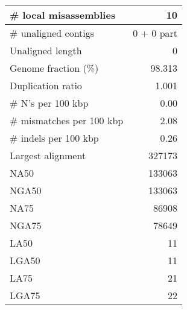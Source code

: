 \documentclass[12pt,a4paper]{article}
\begin{document}
\begin{table}[ht]
\begin{center}
\begin{tabular}{|l*{1}{|r}|}
\# local misassemblies & 10 \\ \hline
\# unaligned contigs & 0 + 0 part \\ \hline
Unaligned length & 0 \\ \hline
Genome fraction (\%) & 98.313 \\ \hline
Duplication ratio & 1.001 \\ \hline
\# N's per 100 kbp & 0.00 \\ \hline
\# mismatches per 100 kbp & 2.08 \\ \hline
\# indels per 100 kbp & 0.26 \\ \hline
Largest alignment & 327173 \\ \hline
NA50 & 133063 \\ \hline
NGA50 & 133063 \\ \hline
NA75 & 86908 \\ \hline
NGA75 & 78649 \\ \hline
LA50 & 11 \\ \hline
LGA50 & 11 \\ \hline
LA75 & 21 \\ \hline
LGA75 & 22 \\ \hline
\end{tabular}
\end{center}
\end{table}
\end{document}

